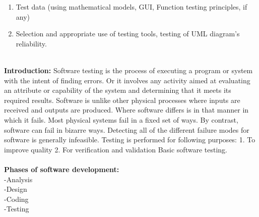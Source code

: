 \begin{enumerate}
\begin{enumerate}
\item Test data (using mathematical models, GUI, Function testing principles, if any) 
\item Selection and appropriate use of testing tools, testing of UML diagram's reliability.
\end{enumerate}
\\
\textbf{Introduction:} Software testing is the process of executing a program or system with the intent of finding errors. Or it involves any activity aimed at evaluating an attribute or capability of the system and determining that it meets its required results. Software is unlike other physical processes where inputs are received and outputs are produced. Where software differs is in that manner in which it fails. Most physical systems fail in a fixed set of ways. By contrast, software can fail in bizarre ways. Detecting all of the different failure modes for software is generally infeasible. Testing is performed for following purposes: 1. To improve quality 2. For verification and validation Basic software testing.\\ 
\\
\textbf{Phases of software development:}\\
 -Analysis\\
 -Design\\
 -Coding\\
 -Testing\\


\end{enumerate}
